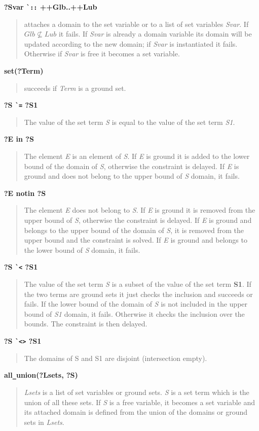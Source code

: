 {\bf ?Svar \verb/`::/ ++Glb..++Lub} 
\begin{quote}
attaches a domain to the set variable or to a list of set variables
{\em Svar}.
If
$Glb \not\subseteq Lub$
it fails. If {\em Svar} is already a domain
variable its domain will be updated according to the new domain; if
{\em Svar} is instantiated it fails. Otherwise if {\em Svar} is free it
becomes a set variable.
\end{quote}
{\bf set(?Term)} 
\begin{quote}
succeeds if {\em Term} is a ground set.
\end{quote}
{\bf ?S \verb/`=/ ?S1} 
\begin{quote}
The value of the set term {\em S} is equal to
the value of the set term {\em S1}.
\end{quote}
{\bf ?E in ?S} 
\begin{quote}
The element {\em E} is an element of {\em S}.  If {\em E} is ground it
is added to the lower bound of the domain of {\em S}, otherwise the constraint is
delayed. If {\em E} is ground and does not belong to the upper bound
of {\em S} domain, it fails.
\end{quote}
{\bf ?E notin ?S}
\begin{quote}
The element {\em E} does not belong to {\em S}. If {\em E} is ground
it is removed from the upper bound of {\em S}, otherwise the
constraint is delayed. If {\em E} is ground and belongs to the upper
bound of the domain of {\em S}, it is removed from the upper bound and
the constraint is solved. If {\em E} is ground and belongs to the
lower bound of {\em S} domain, it fails.
\end{quote}
{\bf ?S \verb/`</ ?S1} 
\begin{quote}
The value of the set term {\em S} is a subset of the value of the set
term {\bf S1}. If the two terms are ground sets it just checks the
inclusion and succeeds or fails. If the lower bound of the domain of {\em
S} is not included in the upper bound of {\em S1} domain, it fails.
Otherwise it checks the inclusion over the bounds. The constraint is
then delayed.
\end{quote}
{\bf ?S \verb/`<>/ ?S1}
\begin{quote}
The domains of S and S1 are disjoint (intersection empty).
\end{quote}
{\bf all\verb/_/union(?Lsets, ?S)}
\begin{quote}
{\em Lsets} is a list of set variables or ground sets. {\em S} is a
set term which is the union of all these sets. If {\em S} is a free
variable, it becomes a set variable and its attached domain is defined
from the union of the domains or ground sets in {\em Lsets}.
\end{quote}
